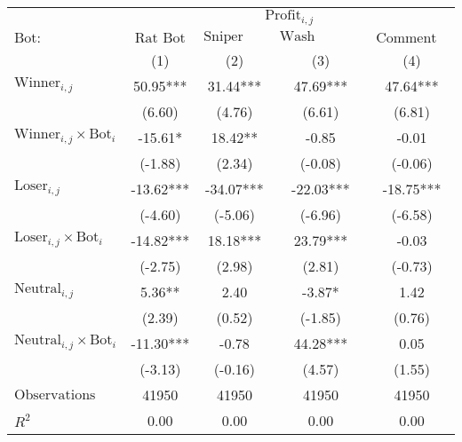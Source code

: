 \begin{tabular}{lcccc}
\toprule
 & \multicolumn{4}{c}{$\text{Profit}_{i,j}$} \\
\cline{2-5}
 $\text{Bot}:$ & $\text{Rat Bot}$ & $\text{Sniper Bot}$ & $\text{Wash Trading Bot}$ & $\text{Comment Bot}$ \\
 & (1) & (2) & (3) & (4)\\
\midrule
$\text{Winner}_{i,j}$ & 50.95*** & 31.44*** & 47.69*** & 47.64*** \\
 & (6.60) & (4.76) & (6.61) & (6.81) \\
$\text{Winner}_{i,j} \times \text{Bot}_i$ & -15.61* & 18.42** & -0.85 & -0.01 \\
 & (-1.88) & (2.34) & (-0.08) & (-0.06) \\
$\text{Loser}_{i,j}$ & -13.62*** & -34.07*** & -22.03*** & -18.75*** \\
 & (-4.60) & (-5.06) & (-6.96) & (-6.58) \\
$\text{Loser}_{i,j} \times \text{Bot}_i$ & -14.82*** & 18.18*** & 23.79*** & -0.03 \\
 & (-2.75) & (2.98) & (2.81) & (-0.73) \\
$\text{Neutral}_{i,j}$ & 5.36** & 2.40 & -3.87* & 1.42 \\
 & (2.39) & (0.52) & (-1.85) & (0.76) \\
$\text{Neutral}_{i,j} \times \text{Bot}_i$ & -11.30*** & -0.78 & 44.28*** & 0.05 \\
 & (-3.13) & (-0.16) & (4.57) & (1.55) \\
$\text{Observations}$ & 41950 & 41950 & 41950 & 41950 \\
$R^2$ & 0.00 & 0.00 & 0.00 & 0.00 \\
\bottomrule
\end{tabular}